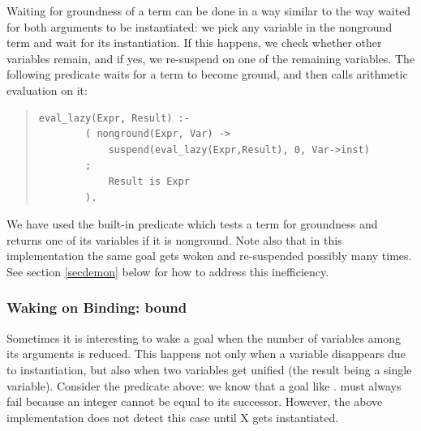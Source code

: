 Waiting for groundness of a term can be done in a way similar to the
way  waited for both arguments to be instantiated: we
pick
any variable in the nonground term and wait for its instantiation.
If this happens, we check whether other variables remain, and if yes,
we re-suspend on one of the remaining variables. The following predicate
waits for a term to become ground, and then calls arithmetic evaluation on it:
\begin{quote}
\begin{verbatim}
eval_lazy(Expr, Result) :-
        ( nonground(Expr, Var) ->
            suspend(eval_lazy(Expr,Result), 0, Var->inst)
        ;
            Result is Expr
        ).
\end{verbatim}
\end{quote}
We have used the built-in predicate
which tests a term for groundness and returns one of its variables
if it is nonground. Note also that in this implementation the same
 goal gets woken and re-suspended possibly many times.
See section \ref{secdemon} below for how to address this inefficiency.


\subsubsection{Waking on Binding: bound}

Sometimes it is interesting to wake a goal when the number of variables
among its arguments is reduced. This happens not only when a variable
disappears due to instantiation, but also when two variables get unified
(the result being a single variable). Consider the 
predicate
above: we know that a goal like . must always fail
because an integer cannot be equal to its successor. However, the above
implementation does not detect this case until X gets instantiated.

